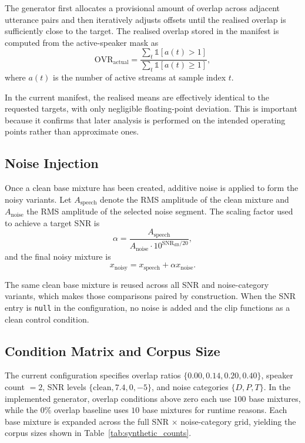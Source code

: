 The generator first allocates a provisional amount of overlap across adjacent utterance pairs and then iteratively adjusts offsets until the realised overlap is sufficiently close to the target. The realised overlap stored in the manifest is computed from the active-speaker mask as
\begin{equation}
\mathrm{OVR}_{\mathrm{actual}} =
\frac{\sum_t \mathbb{1}[a(t) > 1]}{\sum_t \mathbb{1}[a(t) \geq 1]},
\end{equation}
where \(a(t)\) is the number of active streams at sample index \(t\).

In the current manifest, the realised means are effectively identical to the requested targets, with only negligible floating-point deviation. This is important because it confirms that later analysis is performed on the intended operating points rather than approximate ones.

\subsection{Noise Injection}
Once a clean base mixture has been created, additive noise is applied to form the noisy variants. Let \(A_{\mathrm{speech}}\) denote the RMS amplitude of the clean mixture and \(A_{\mathrm{noise}}\) the RMS amplitude of the selected noise segment. The scaling factor used to achieve a target SNR is
\begin{equation}
\alpha = \frac{A_{\mathrm{speech}}}{A_{\mathrm{noise}} \cdot 10^{\mathrm{SNR}_{\mathrm{dB}}/20}},
\end{equation}
and the final noisy mixture is
\begin{equation}
x_{\mathrm{noisy}} = x_{\mathrm{speech}} + \alpha x_{\mathrm{noise}}.
\end{equation}

The same clean base mixture is reused across all SNR and noise-category variants, which makes those comparisons paired by construction. When the SNR entry is \texttt{null} in the configuration, no noise is added and the clip functions as a clean control condition.

\subsection{Condition Matrix and Corpus Size}
The current configuration specifies overlap ratios \(\{0.00, 0.14, 0.20, 0.40\}\), speaker count \(=2\), SNR levels \(\{\text{clean}, 7.4, 0, -5\}\), and noise categories \(\{D, P, T\}\). In the implemented generator, overlap conditions above zero each use \(100\) base mixtures, while the \(0\%\) overlap baseline uses \(10\) base mixtures for runtime reasons. Each base mixture is expanded across the full SNR \(\times\) noise-category grid, yielding the corpus sizes shown in Table~\ref{tab:synthetic_counts}.

